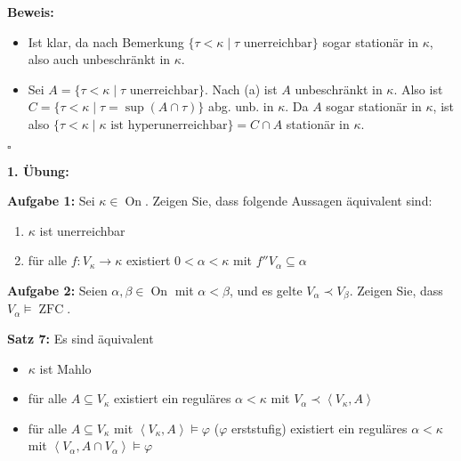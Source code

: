 \documentclass[a4paper,fontsize=11pt]{scrartcl}
\newcommand{\ZFC}{\operatorname{ZFC}}
\newcommand{\On}{\operatorname{On}}
\begin{document}
{\bf Beweis:}
\begin{itemize}
\item[(a)] Ist klar, da nach Bemerkung $\{\tau<\kappa\mid \tau\mbox{ unerreichbar}\}$  sogar stationär in $\kappa$, also auch unbeschränkt in $\kappa$.
\item[(b)] Sei $A=\{\tau<\kappa\mid \tau \mbox{ unerreichbar}\}$. Nach
  (a) ist $A$ unbeschränkt in $\kappa$. Also ist $C=\{ \tau<\kappa\mid
  \tau=\sup(A\cap\tau)\}$ abg. unb. in $\kappa$. Da $A$ sogar
  stationär in $\kappa$, ist also $\{\tau<\kappa\mid \kappa \mbox{ ist
    hyperunerreichbar}\}=C\cap A$ stationär in $\kappa$.
\end{itemize}

\hfill $\square$


{\bf 1. Übung:}

{\bf Aufgabe 1:} Sei $\kappa\in\On$. Zeigen Sie, dass folgende
Aussagen äquivalent sind:
\begin{enumerate}
\item $\kappa$ ist unerreichbar
\item für alle $f:V_\kappa\rightarrow\kappa$ existiert
  $0<\alpha<\kappa$ mit $f''V_\alpha\subseteq\alpha$
\end{enumerate}

{\bf Aufgabe 2:} Seien $\alpha,\beta\in\On$ mit $\alpha<\beta$, und es
gelte $V_\alpha\prec V_\beta$. Zeigen Sie, dass $V_\alpha\models\ZFC$.

{\bf Satz 7:} Es sind äquivalent
\begin{itemize}
  \item[(1)] $\kappa$ ist Mahlo
  \item[(2)] für alle $A\subseteq V_\kappa$ existiert ein reguläres
    $\alpha<\kappa$ mit $V_\alpha\prec\left<V_\kappa,A\right>$
  \item[(3)] für alle $A\subseteq V_\kappa$ mit
    $\left<V_\kappa,A\right>\models\varphi$ ($\varphi$ erststufig)
    existiert ein reguläres $\alpha<\kappa$ mit $\left<V_\alpha,A\cap
    V_\alpha\right>\models\varphi$
\end{itemize}
\end{document}
